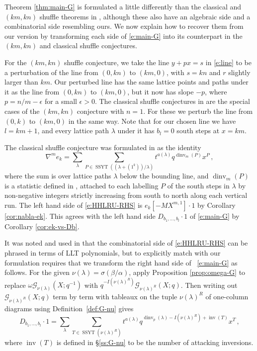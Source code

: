 \documentclass[12pt]{amsart}
\theoremstyle{definition}
\theoremstyle{remark}
\newcommand{\Gcal}{{\mathcal G}}
\DeclareMathOperator{\dinv}{dinv}
\DeclareMathOperator{\inv}{inv}
\DeclareMathOperator{\SSYT}{SSYT}
\begin{document}
Theorem \ref{thm:main-G} is formulated a little differently than the
classical and $(km,kn)$ shuffle theorems in \cite{BeGaSeXi16,
HaHaLoReUl05}, {although these also have an algebraic side and a
combinatorial side resembling ours.}  We now explain how to recover
them from our version by transforming each side of \eqref{e:main-G}
into its counterpart in the $(km,kn)$ and classical shuffle
conjectures.

For the $(km,kn)$ shuffle conjecture, we take the line {$y+px = s$} in
\eqref{e:line} to be a perturbation of the line from $(0,kn)$ to
$(km,0)$, with $s = kn$ and $r$ slightly larger than $km$.  Our
perturbed line has the same lattice points and paths under it as the
line from $(0,kn)$ to $(km,0)$, but it now has slope $-p$, where $p =
n/m-\epsilon $ for a small $\epsilon >0$.  The classical shuffle
conjectures in \cite{HaHaLoReUl05} are the special cases of the
$(km,kn)$ conjecture with $n=1$.  For these we perturb the line from
$(0,k)$ to $(km,0)$ in the same way.  Note that for our chosen line we
have $l=km+1$, and every lattice path $\lambda $ under it has
$b_{l}=0$ south steps at $x=km$.


The classical shuffle conjecture was formulated in \cite[Conjecture
6.2.2]{HaHaLoReUl05} as the identity
\begin{equation}\label{e:HHLRU-RHS}
\nabla^{m} e_{k} = \sum _{\lambda } 
\sum _{P\in \SSYT {((\lambda+(1^k))/\lambda)}}
t^{a(\lambda )} q^{\dinv _{m}(P)} x^{P}\,,
\end{equation}
where the sum is over lattice paths $\lambda$ below the bounding line,
and {$\dinv_m(P)$ is a statistic defined in \cite{HaHaLoReUl05},
attached to each labelling $P$ of the south steps in $\lambda $ by
non-negative integers} strictly increasing from south to north along
each vertical run.  The left hand side of \eqref{e:HHLRU-RHS} is
$e_{k}[-M X^{m,1}] \cdot 1$ by Corollary \ref{cor:nabla-ek}.  This
agrees with the left hand side $D_{b_{1},\ldots,b_{l}}\cdot 1$
of \eqref{e:main-G} by Corollary \ref{cor:ek-vs-Db}.


It was noted and used in \cite{HaHaLoReUl05} that the combinatorial
side of \eqref{e:HHLRU-RHS} can be phrased in terms of LLT
polynomials, but to explicitly match with our formulation requires
that we transform the right hand side of ~\eqref{e:main-G} as follows.
For the given $\nu(\lambda)=\sigma(\beta/\alpha)$, apply Proposition
\ref{prop:omega-G} to replace $\omega \Gcal_{\nu (\lambda)}(X;q^{-1})$
with $q^{-I(\nu (\lambda )^{R})} \Gcal_{\nu (\lambda)^{R}}(X;q)$.
Then writing out $\Gcal_{\nu(\lambda)^R}(X;q)$ term by term with
tableaux on the tuple $\nu(\lambda )^{R}$ of one-column diagrams using
Definition~\ref{def:G-nu} gives
\begin{equation}\label{e:main-G-cor}
D_{b_{1},\ldots,b_{l}} \cdot 1 = \sum _{\lambda } \sum _{T\in \SSYT
(\nu (\lambda )^{R})} t^{a(\lambda )} q^{\dinv _{p}(\lambda ) -I(\nu
(\lambda )^{R})+\inv(T)} x^{T}\,,
\end{equation}
where $\inv(T)$ is defined in \S\ref{ss:G-nu} to be the number of
attacking inversions.
\end{document}

